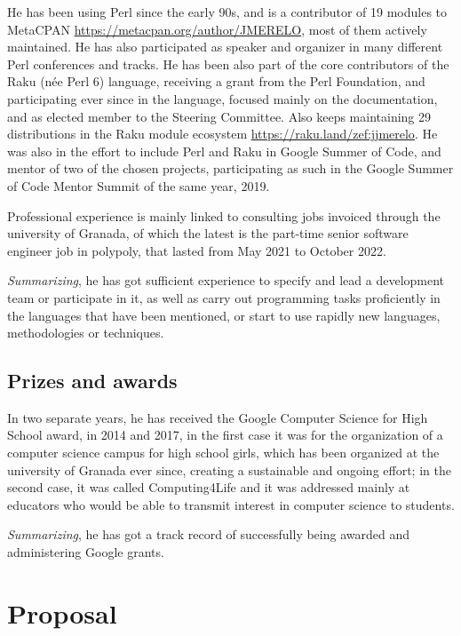 \documentclass[a4paper,12pt]{article}
\begin{document}
He has been using Perl since the early 90s, and is a contributor of 19 modules
to MetaCPAN \url{https://metacpan.org/author/JMERELO}, most of them actively
maintained. He has also participated as speaker and organizer in many different
Perl conferences and tracks. He has been also part of the core contributors of
the Raku (née Perl 6) language, receiving a grant from the Perl Foundation, and
participating ever since in the language, focused mainly on the documentation,
and as elected member to the Steering Committee. Also keeps maintaining 29
distributions in the Raku module ecosystem
\url{https://raku.land/zef:jjmerelo}. He was also in the effort to include Perl
and Raku in Google Summer of Code, and mentor of two of the chosen projects,
participating as such in the Google Summer of Code Mentor Summit of the same
year, 2019.



Professional experience is mainly linked to consulting jobs invoiced through the
university of Granada, of which the latest is the part-time senior software
engineer job in polypoly, that lasted from May 2021 to October 2022.

{\em Summarizing}, he has got sufficient experience to specify and lead a development
team or participate in it, as well as carry out programming tasks proficiently
in the languages that have been mentioned, or start to use rapidly new
languages, methodologies or techniques.

\subsection{Prizes and awards}

In two separate years, he has received the Google Computer Science for High
School award, in 2014 and 2017, in the first case it was for the organization of
a computer science campus for high school girls, which has been organized at the
university of Granada ever since, creating a sustainable and ongoing effort; in
the second case, it was called Computing4Life and it was addressed mainly at
educators who would be able to transmit interest in computer science to
students.

{\em Summarizing}, he has got a track record of successfully being awarded and
administering Google grants.

\newpage

\section{Proposal}





\end{document}
